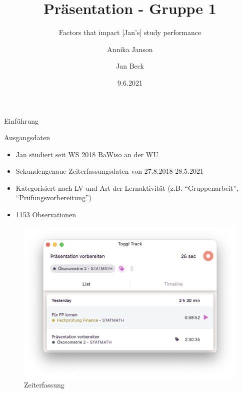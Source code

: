 \documentclass[
  ignorenonframetext,
]{beamer}
\title{Präsentation - Gruppe 1}
\subtitle{Factors that impact {[}Jan's{]} study performance}
\author{Annika Janson \and Jan Beck}
\date{9.6.2021}
\providecommand{\tightlist}{%
  \setlength{\itemsep}{0pt}\setlength{\parskip}{0pt}}
\begin{document}
\frame{\titlepage}

\begin{frame}{Einführung}
\protect\hypertarget{einfuxfchrung}{}
\begin{block}{Ausgangsdaten}
\protect\hypertarget{ausgangsdaten}{}
\begin{itemize}
\tightlist
\item
  Jan studiert seit WS 2018 BaWiso an der WU
\item
  Sekundengenaue Zeiterfassungsdaten von 27.8.2018-28.5.2021
\item
  Kategorisiert nach LV und Art der Lernaktivität (z.B.
  ``Gruppenarbeit'', ``Prüfungsvorbereitung'')
\item
  1153 Observationen
\end{itemize}

\begin{figure}
\centering
\includegraphics{images/toggl.png}
\caption{Zeiterfassung}
\end{figure}
\end{block}
\end{frame}
\end{document}
